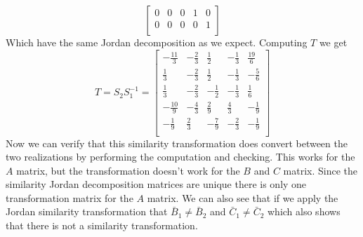 \documentclass{article}
\begin{document}
\begin{enumerate}[(a)]
$$\begin{bmatrix}
0 & 0 & 0 & 1 & 0 \\
0 & 0 & 0 & 0 & 1 \\
\end{bmatrix}
$$
Which have the same Jordan decomposition as we expect.
Computing $T$ we get
$$
T =
S_2S_1^{-1}
=
\begin{bmatrix}
-\frac{11}{3} & -\frac{2}{3} & \frac{1}{2} & -\frac{1}{3} & \frac{19}{6} \\
\frac{1}{3} & -\frac{2}{3} & \frac{1}{2} & -\frac{1}{3} & -\frac{5}{6} \\
\frac{1}{3} & -\frac{2}{3} & -\frac{1}{2} & -\frac{1}{3} & \frac{1}{6} \\
-\frac{10}{9} & -\frac{4}{3} & \frac{2}{9} & \frac{4}{3} & -\frac{1}{9} \\
-\frac{1}{9} & \frac{2}{3} & -\frac{7}{9} & -\frac{2}{3} & -\frac{1}{9} \\
\end{bmatrix}
$$
Now we can verify that this similarity transformation does convert between the two realizations by performing the computation and checking.
This works for the $A$ matrix, but the transformation doesn't work for the $B$ and $C$ matrix.
Since the similarity Jordan decomposition matrices are unique there is only one transformation matrix for the $A$ matrix.
We can also see that if we apply the Jordan similarity transformation that $\bar{B}_1 \neq \bar{B}_2$ and $\bar{C}_1 \neq \bar{C}_2$ which also shows that there is not a similarity transformation.
\end{enumerate}

\newpage
\end{document}
